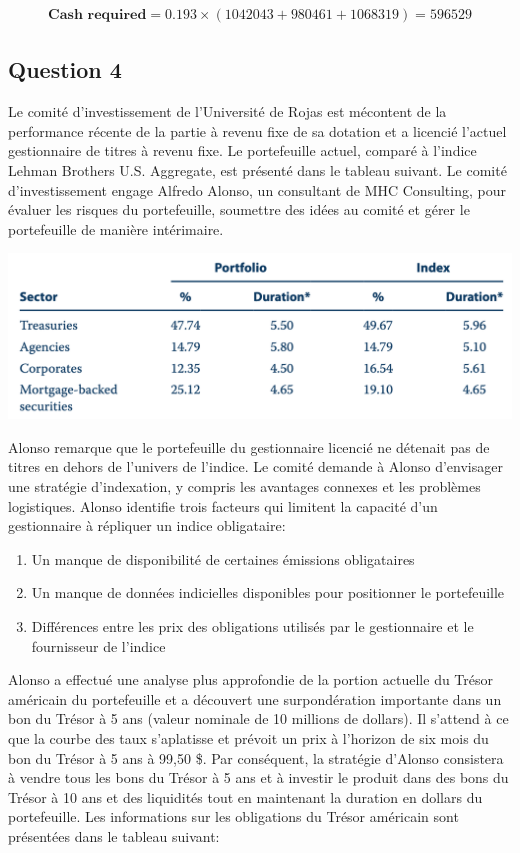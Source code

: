 \documentclass[12pt]{article}
\begin{document}
\begin{itemize}
\begin{align*}
\textbf{Cash required} = 0.193 × (1042043 + 980461 + 1068319)=596529
\end{align*}

\newpage

\subsection{Question 4}
Le comité d'investissement de l'Université de Rojas est mécontent de la performance récente de la partie à revenu fixe de sa dotation et a licencié l'actuel gestionnaire de titres à revenu fixe. Le portefeuille actuel, comparé à l'indice Lehman Brothers U.S. Aggregate, est présenté dans le tableau suivant. Le comité d’investissement engage Alfredo Alonso, un consultant de MHC Consulting, pour évaluer les risques du portefeuille, soumettre des idées au comité et gérer le portefeuille de manière intérimaire.

\includegraphics[width=14cm]{13}

Alonso remarque que le portefeuille du gestionnaire licencié ne détenait pas de titres en dehors de l’univers de l’indice. Le comité demande à Alonso d'envisager une stratégie d'indexation, y compris les avantages connexes et les problèmes logistiques. Alonso identifie trois facteurs qui limitent la capacité d'un gestionnaire à répliquer un indice obligataire:
\begin{enumerate}
\item Un manque de disponibilité de certaines émissions obligataires
\item Un manque de données indicielles disponibles pour positionner le portefeuille
\item Différences entre les prix des obligations utilisés par le gestionnaire et le fournisseur de l'indice
\end{enumerate}
Alonso a effectué une analyse plus approfondie de la portion actuelle du Trésor américain du portefeuille et a découvert une surpondération importante dans un bon du Trésor à 5 ans (valeur nominale de 10 millions de dollars). Il s'attend à ce que la courbe des taux s'aplatisse et prévoit un prix à l'horizon de six mois du bon du Trésor à 5 ans à 99,50 \$. Par conséquent, la stratégie d’Alonso consistera à vendre tous les bons du Trésor à 5 ans et à investir le produit dans des bons du Trésor à 10 ans et des liquidités tout en maintenant la duration en dollars du portefeuille. Les informations sur les obligations du Trésor américain sont présentées dans le tableau suivant:


\end{itemize}
\end{document}
